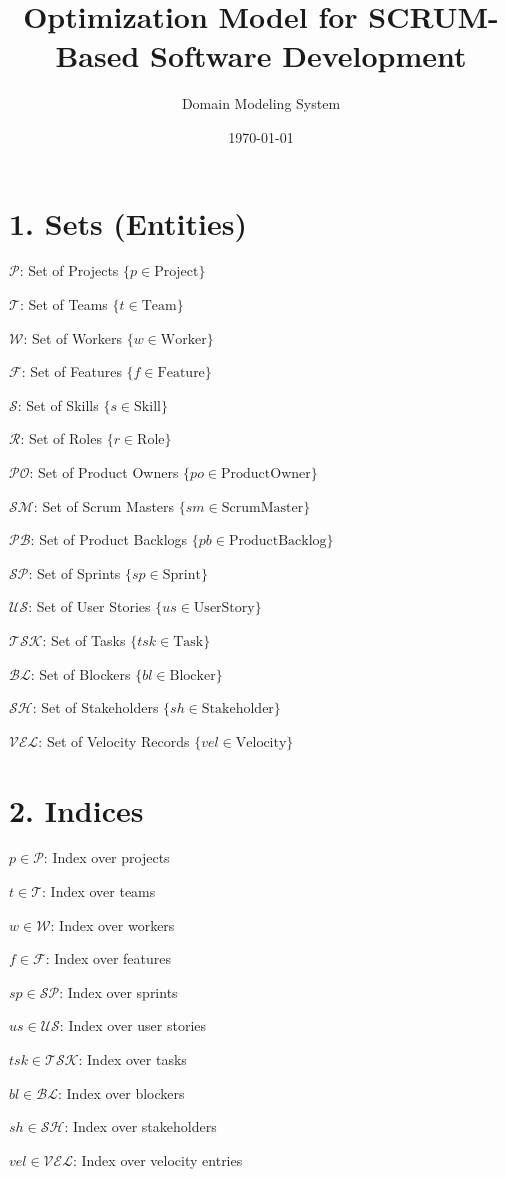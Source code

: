 \documentclass[12pt]{article}
\title{Optimization Model for SCRUM-Based Software Development}
\author{Domain Modeling System}
\date{\today}
\begin{document}
\maketitle
\tableofcontents
\newpage

\section{1. Sets (Entities)}
\item $ \mathcal{P} $: Set of Projects $ \{ p \in \text{Project} \} $
    \item $ \mathcal{T} $: Set of Teams $ \{ t \in \text{Team} \} $
    \item $ \mathcal{W} $: Set of Workers $ \{ w \in \text{Worker} \} $
    \item $ \mathcal{F} $: Set of Features $ \{ f \in \text{Feature} \} $
    \item $ \mathcal{S} $: Set of Skills $ \{ s \in \text{Skill} \} $
    \item $ \mathcal{R} $: Set of Roles $ \{ r \in \text{Role} \} $
    \item $ \mathcal{PO} $: Set of Product Owners $ \{ po \in \text{ProductOwner} \} $
    \item $ \mathcal{SM} $: Set of Scrum Masters $ \{ sm \in \text{ScrumMaster} \} $
    \item $ \mathcal{PB} $: Set of Product Backlogs $ \{ pb \in \text{ProductBacklog} \} $
    \item $ \mathcal{SP} $: Set of Sprints $ \{ sp \in \text{Sprint} \} $
    \item $ \mathcal{US} $: Set of User Stories $ \{ us \in \text{UserStory} \} $
    \item $ \mathcal{TSK} $: Set of Tasks $ \{ tsk \in \text{Task} \} $
    \item $ \mathcal{BL} $: Set of Blockers $ \{ bl \in \text{Blocker} \} $
    \item $ \mathcal{SH} $: Set of Stakeholders $ \{ sh \in \text{Stakeholder} \} $
    \item $ \mathcal{VEL} $: Set of Velocity Records $ \{ vel \in \text{Velocity} \} $

\section{2. Indices}
\item $ p \in \mathcal{P} $: Index over projects
    \item $ t \in \mathcal{T} $: Index over teams
    \item $ w \in \mathcal{W} $: Index over workers
    \item $ f \in \mathcal{F} $: Index over features
    \item $ sp \in \mathcal{SP} $: Index over sprints
    \item $ us \in \mathcal{US} $: Index over user stories
    \item $ tsk \in \mathcal{TSK} $: Index over tasks
    \item $ bl \in \mathcal{BL} $: Index over blockers
    \item $ sh \in \mathcal{SH} $: Index over stakeholders
    \item $ vel \in \mathcal{VEL} $: Index over velocity entries
\end{document}
